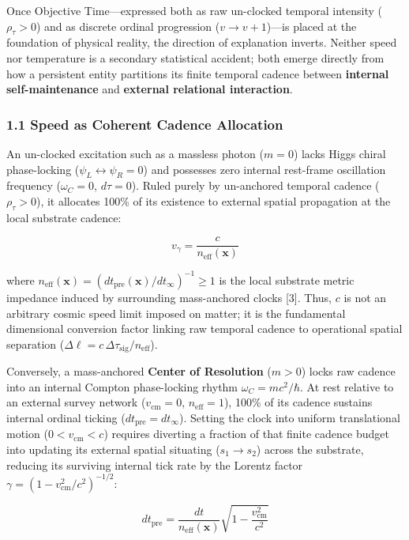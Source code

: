 \documentclass[
]{article}
\begin{document}
Once Objective Time---expressed both as raw un-clocked temporal
intensity (\(\rho_\tau > 0\)) and as discrete ordinal progression
(\(v \to v + 1\))---is placed at the foundation of physical reality, the
direction of explanation inverts. Neither speed nor temperature is a
secondary statistical accident; both emerge directly from how a
persistent entity partitions its finite temporal cadence between
\textbf{internal self-maintenance} and \textbf{external relational
interaction}.

\subsubsection{1.1 Speed as Coherent Cadence
Allocation}\label{speed-as-coherent-cadence-allocation}

An un-clocked excitation such as a massless photon (\(m = 0\)) lacks
Higgs chiral phase-locking (\(\psi_L \leftrightarrow \psi_R = 0\)) and
possesses zero internal rest-frame oscillation frequency
(\(\omega_C = 0\), \(d\tau = 0\)). Ruled purely by un-anchored temporal
cadence (\(\rho_\tau > 0\)), it allocates 100\% of its existence to
external spatial propagation at the local substrate cadence:

\[v_{\gamma} = \frac{c}{n_{\mathrm{eff}}(\mathbf{x})}\]

where
\(n_{\mathrm{eff}}(\mathbf{x}) = (dt_{\mathrm{pre}}(\mathbf{x})/dt_\infty)^{-1} \ge 1\)
is the local substrate metric impedance induced by surrounding
mass-anchored clocks {[}3{]}. Thus, \(c\) is not an arbitrary cosmic
speed limit imposed on matter; it is the fundamental dimensional
conversion factor linking raw temporal cadence to operational spatial
separation
(\(\Delta\ell = c\,\Delta\tau_{\mathrm{sig}} / n_{\mathrm{eff}}\)).

Conversely, a mass-anchored \textbf{Center of Resolution} (\(m > 0\))
locks raw cadence into an internal Compton phase-locking rhythm
\(\omega_C = m c^2 / \hbar\). At rest relative to an external survey
network (\(v_{\mathrm{cm}} = 0\), \(n_{\mathrm{eff}} = 1\)), 100\% of
its cadence sustains internal ordinal ticking
(\(dt_{\mathrm{pre}} = dt_\infty\)). Setting the clock into uniform
translational motion (\(0 < v_{\mathrm{cm}} < c\)) requires diverting a
fraction of that finite cadence budget into updating its external
spatial situating (\(s_1 \to s_2\)) across the substrate, reducing its
surviving internal tick rate by the Lorentz factor
\(\gamma = (1 - v_{\mathrm{cm}}^2/c^2)^{-1/2}\):

\[dt_{\mathrm{pre}} = \frac{dt}{n_{\mathrm{eff}}(\mathbf{x})}\sqrt{1 - \frac{v_{\mathrm{cm}}^2}{c^2}}\]
\end{document}
